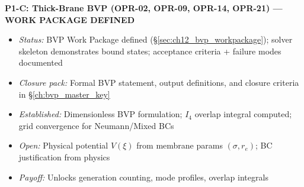 \begin{tcolorbox}[breakable, enhanced, colback=blue!5, colframe=blue!60!black,
    title=\textbf{OPR Closure Plan: Prioritized Research Program}, width=\linewidth]
\textbf{P1-C: Thick-Brane BVP (OPR-02, OPR-09, OPR-14, OPR-21) --- WORK PACKAGE DEFINED}
\begin{itemize}[nosep]
    \item \emph{Status:} BVP Work Package defined (\S\ref{sec:ch12_bvp_workpackage}); solver skeleton demonstrates bound states; acceptance criteria + failure modes documented
    \item \emph{Closure pack:} Formal BVP statement, output definitions, and closure criteria in \S\ref{ch:bvp_master_key}
    \item \emph{Established:} Dimensionless BVP formulation; $I_4$ overlap integral computed; grid convergence for Neumann/Mixed BCs
    \item \emph{Open:} Physical potential $V(\xi)$ from membrane params $(\sigma, r_e)$; BC justification from physics
    \item \emph{Payoff:} Unlocks generation counting, mode profiles, overlap integrals
\end{itemize}


\end{tcolorbox}

